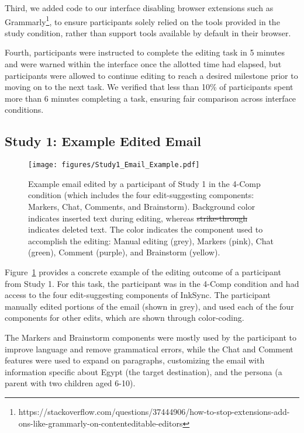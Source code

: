 \documentclass[manuscript]{acmart}
\begin{document}
Third, we added code to our interface disabling browser extensions such as Grammarly\footnote{https://stackoverflow.com/questions/37444906/how-to-stop-extensions-add-ons-like-grammarly-on-contenteditable-editors}, to ensure participants solely relied on the tools provided in the study condition, rather than support tools available by default in their browser.

Fourth, participants were instructed to complete the editing task in 5 minutes and were warned within the interface once the allotted time had elapsed, but participants were allowed to continue editing to reach a desired milestone prior to moving on to the next task. We verified that less than 10\% of participants spent more than 6 minutes completing a task, ensuring fair comparison across interface conditions.

\subsection{Study 1: Example Edited Email} \label{app:study1_example}

\begin{figure}
    \centering
    \texttt{[image: figures/Study1\_Email\_Example.pdf]}
    \caption{Example email edited by a participant of Study 1 in the 4-Comp condition (which includes the four edit-suggesting components: Markers, Chat, Comments, and Brainstorm). Background color indicates inserted text during editing, whereas \sout{strike-through} indicates deleted text. The color indicates the component used to accomplish the editing: Manual editing (grey), Markers (pink), Chat (green), Comment (purple), and Brainstorm (yellow).}
    \label{fig:study1_email_example}
\end{figure}

Figure~\ref{fig:study1_email_example} provides a concrete example of the editing outcome of a participant from Study 1. For this task, the participant was in the 4-Comp condition and had access to the four edit-suggesting components of InkSync. The participant manually edited portions of the email (shown in grey), and used each of the four components for other edits, which are shown through color-coding.

The Markers and Brainstorm components were mostly used by the participant to improve language and remove grammatical errors, while the Chat and Comment features were used to expand on paragraphs, customizing the email with information specific about Egypt (the target destination), and the persona (a parent with two children aged 6-10).
\end{document}
